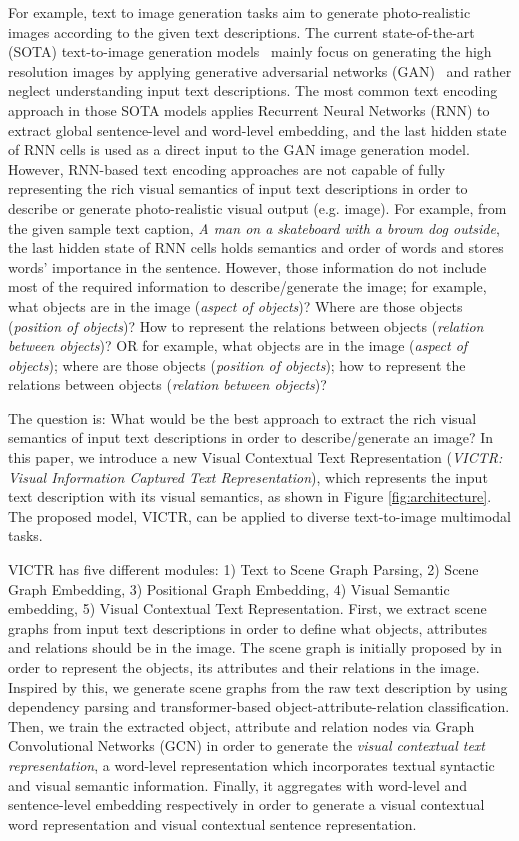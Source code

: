 \documentclass[11pt]{article}
\begin{document}
For example, text to image generation tasks aim to generate photo-realistic images according to the given text descriptions. The current state-of-the-art (SOTA) text-to-image generation models~\cite{xu2018attngan,zhang2017stackgan,zhu2019dm} mainly focus on generating the high resolution images by applying generative adversarial networks (GAN)~\cite{goodfellow2014generative} and rather neglect understanding input text descriptions. The most common text encoding approach in those SOTA models applies Recurrent Neural Networks (RNN) to extract global sentence-level and word-level embedding, and the last hidden state of RNN cells is used as a direct input to the GAN image generation model. However, RNN-based text encoding approaches are not capable of fully representing the rich visual semantics of input text descriptions in order to describe or generate photo-realistic visual output (e.g. image). For example, from the given sample text caption, \textit{A man on a skateboard with a brown dog outside}, the last hidden state of RNN cells holds semantics and order of words and stores words' importance in the sentence. However, those information do not include most of the required information to describe/generate the image; for example, what objects are in the image (\textit{aspect of objects})? Where are those objects (\textit{position of objects})? How to represent the relations between objects (\textit{relation between objects})? OR for example, what objects are in the image (\textit{aspect of objects}); where are those objects (\textit{position of objects}); how to represent the relations between objects (\textit{relation between objects})? 

The question is: What would be the best approach to extract the rich visual semantics of input text descriptions in order to describe/generate an image? In this paper, we introduce a new Visual Contextual Text Representation (\textit{VICTR: Visual Information Captured Text Representation}), which represents the input text description with its visual semantics, as shown in Figure \ref{fig:architecture}. The proposed model, VICTR, can be applied to diverse text-to-image multimodal tasks.

VICTR has five different modules: 1) Text to Scene Graph Parsing, 2) Scene Graph Embedding, 3) Positional Graph Embedding, 4) Visual Semantic embedding, 5) Visual Contextual Text Representation. First, we extract scene graphs from input text descriptions in order to define what objects, attributes and relations should be in the image. The scene graph is initially proposed by  in order to represent the objects, its attributes and their relations in the image. Inspired by this, we generate scene graphs from the raw text description by using dependency parsing and transformer-based object-attribute-relation classification. Then, we train the extracted object, attribute and relation nodes via Graph Convolutional Networks (GCN) in order to generate the \textit{visual contextual text representation}, a word-level representation which incorporates textual syntactic and visual semantic information. Finally, it aggregates with word-level and sentence-level embedding respectively in order to generate a visual contextual word representation and visual contextual sentence representation.
\end{document}
